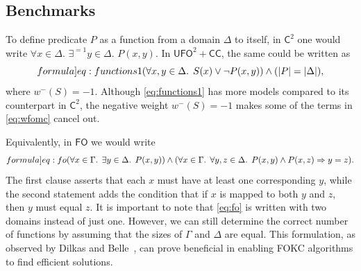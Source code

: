 \documentclass[a4paper,UKenglish,cleveref, autoref, thm-restate]{lipics-v2021}
\newcommand{\Ctwo}{$\mathsf{C}^{2}$}
\newcommand{\FO}{$\mathsf{FO}$}
\newcommand{\UFO}{$\mathsf{UFO}^{2} + \mathsf{CC}$}
\begin{document}
\subsection{Benchmarks}


\begin{example}\label{example:functions}
  To define predicate $P$ as a function from a domain $\Delta$ to itself, in
  \Ctwo{} one would write $\forall x \in \Delta\text{.
  }\exists^{=1} y \in \Delta\text{. }P(x, y)$. In \UFO{}, the same could be
  written as
  \begin{equation}\label[formula]{eq:functions1}
    (\forall x, y \in \Delta\text{. }S(x) \lor \neg P(x, y)) \land (|P| = |\Delta|),
  \end{equation}
  where $w^{-}(S) = -1$. Although \cref{eq:functions1} has more models compared
  to its counterpart in \Ctwo{}, the negative weight $w^{-}(S) = -1$ makes some
  of the terms in \cref{eq:wfomc} cancel out.

  Equivalently, in \FO{} we would write
  \begin{equation}\label[formula]{eq:fo}
    \begin{gathered}
      (\forall x \in \Gamma\text{. }\exists y \in \Delta\text{. }P(x, y)) \land (\forall x \in \Gamma\text{. }\forall y, z \in \Delta\text{. }P(x, y) \land P(x, z) \Rightarrow y = z).
    \end{gathered}
  \end{equation}
  The first clause asserts that each $x$ must have at least one corresponding
  $y$, while the second statement adds the condition that if $x$ is mapped to
  both $y$ and $z$, then $y$ must equal $z$. It is important to note that
  \cref{eq:fo} is written with two domains instead of just one. However, we can
  still determine the correct number of functions by assuming that the sizes of
  $\Gamma$ and $\Delta$ are equal. This formulation, as observed by Dilkas and
  Belle~\cite{DBLP:conf/kr/DilkasB23}, can prove beneficial in enabling FOKC
  algorithms to find efficient solutions.
\end{example}
\end{document}
